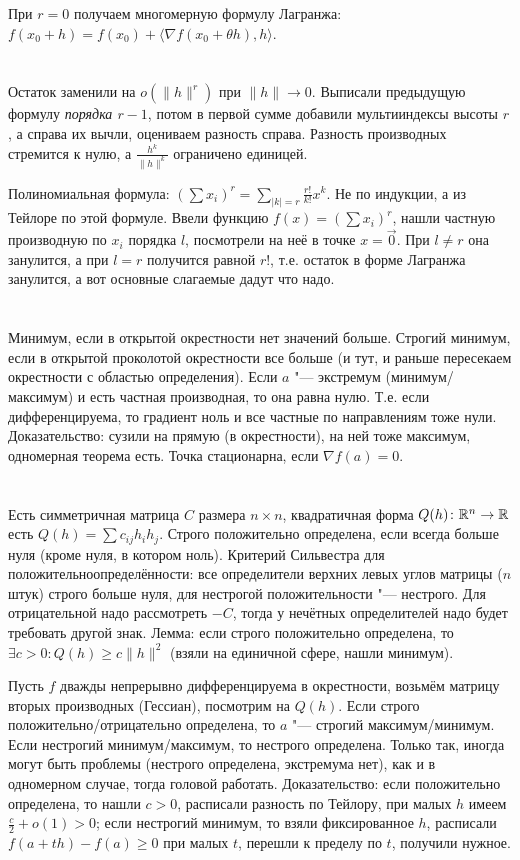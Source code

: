 При $r=0$ получаем многомерную формулу Лагранжа: $f(x_0 + h)=f(x_0) + \langle \nabla f(x_0 + \theta h), h \rangle$.

\section{} %
Остаток заменили на $o(\|h\|^r)$ при $\|h\| \to 0$.
Выписали предыдущую формулу \textit{порядка $r-1$}, потом в первой сумме добавили мультииндексы высоты $r$, а справа их вычли, оцениваем разность справа.
Разность производных стремится к нулю, а $\frac{h^k}{\|h\|^k}$ ограничено единицей.

Полиномиальная формула: $\left(\sum x_i\right)^r = \sum_{|k|=r} \frac{r!}{k!} x^k$.
Не по индукции, а из Тейлоре по этой формуле.
Ввели функцию $f(x) = \left(\sum x_i\right)^r$, нашли частную производную по $x_i$ порядка $l$, посмотрели на неё в точке $x=\vec 0$.
При $l\neq r$ она занулится, а при $l=r$ получится равной $r!$, т.е. остаток в форме Лагранжа занулится, а вот основные слагаемые дадут что надо.

\section{} %
Минимум, если в открытой окрестности нет значений больше.
Строгий минимум, если в открытой проколотой окрестности все больше (и тут, и раньше пересекаем окрестности с областью определения).
Если $a$ "--- экстремум (минимум/максимум) и есть частная производная, то она равна нулю.
Т.е. если дифференцируема, то градиент ноль и все частные по направлениям тоже нули.
Доказательство: сузили на прямую (в окрестности), на ней тоже максимум, одномерная теорема есть.
Точка стационарна, если $\nabla f(a)=0$.

\section{} %
Есть симметричная матрица $C$ размера $n \times n$, квадратичная форма $Q(h) \colon \mathbb{R}^n \to \mathbb{R}$ есть $Q(h)=\sum c_{ij}h_ih_j$.
Строго положительно определена, если всегда больше нуля (кроме нуля, в котором ноль).
Критерий Сильвестра для положительноопределённости: все определители верхних левых углов матрицы ($n$ штук) строго больше нуля,
для нестрогой положительности "--- нестрого.
Для отрицательной надо рассмотреть $-C$, тогда у нечётных определителей надо будет требовать другой знак.
Лемма: если строго положительно определена, то $\exists c>0\colon Q(h) \ge c \|h\|^2$ (взяли на единичной сфере, нашли минимум).

Пусть $f$ дважды непрерывно дифференцируема в окрестности, возьмём матрицу вторых производных (Гессиан), посмотрим на $Q(h)$.
Если строго положительно/отрицательно определена, то $a$ "--- строгий максимум/минимум.
Если нестрогий минимум/максимум, то нестрого определена.
Только так, иногда могут быть проблемы (нестрого определена, экстремума нет), как и в одномерном случае, тогда головой работать.
Доказательство: если положительно определена, то нашли $c>0$, расписали разность по Тейлору, при малых $h$ имеем $\frac c2 + o(1)>0$;
если нестрогий минимум, то взяли фиксированное $h$, расписали $f(a+th)-f(a)\ge 0$ при малых $t$, перешли к пределу по $t$, получили нужное.
